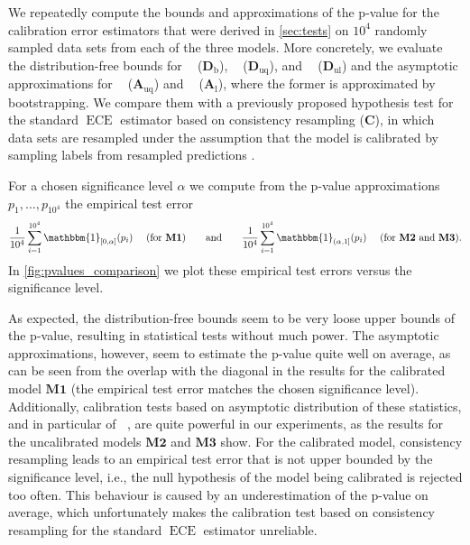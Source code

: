 \documentclass{article}
\DeclareMathOperator{\ECE}{ECE}
\DeclareMathOperator{\biasedestimator}{\widehat{SKCE}_b}
\DeclareMathOperator{\unbiasedestimator}{\widehat{SKCE}_{uq}}
\DeclareMathOperator{\linearestimator}{\widehat{SKCE}_{ul}}
\begin{document}
We repeatedly compute the bounds and approximations of the p-value for the
calibration error estimators that were derived in \cref{sec:tests} on $10^4$
randomly sampled data sets from each of the three models. More concretely, we
evaluate the distribution-free bounds for $\biasedestimator$
($\mathbf{D}_{\mathrm{b}}$), $\unbiasedestimator$ ($\mathbf{D}_{\mathrm{uq}}$), and
$\linearestimator$ ($\mathbf{D}_{\mathrm{ul}}$) and the asymptotic
approximations for $\unbiasedestimator$ ($\mathbf{A}_{\mathrm{uq}}$) and
$\linearestimator$ ($\mathbf{A}_{\mathrm{l}}$), where the former is approximated
by bootstrapping. We compare them with a previously proposed hypothesis test for
the standard $\ECE$ estimator based on consistency resampling ($\mathbf{C}$), in
which data sets are resampled under the assumption that the model is calibrated
by sampling labels from resampled predictions
\citep{broecker07_increas_reliab_reliab_diagr,vaicenavicius19_evaluat}.

For a chosen significance level $\alpha$ we compute from the p-value
approximations $p_1,\ldots,p_{10^4}$ the empirical test error
\begin{equation*}
  \frac{1}{10^4} \sum_{i=1}^{10^4} \mathbbm{1}_{[0, \alpha]}(p_i) \quad \text{ (for } \mathbf{M1} \text{)}
  \qquad \text{and} \qquad
  \frac{1}{10^4} \sum_{i=1}^{10^4} \mathbbm{1}_{(\alpha, 1]}(p_i) \quad \text{ (for } \mathbf{M2} \text{ and } \mathbf{M3} \text{)}.
\end{equation*}
In \cref{fig:pvalues_comparison} we plot these empirical test errors versus the
significance level.

As expected, the distribution-free bounds seem to be very loose upper bounds of
the p-value, resulting in statistical tests without much power. The asymptotic
approximations, however, seem to estimate the p-value quite well on average, as
can be seen from the overlap with the diagonal in the results for the calibrated
model $\mathbf{M1}$ (the empirical test error matches the chosen significance
level). Additionally, calibration tests based on asymptotic distribution of
these statistics, and in particular of $\unbiasedestimator$, are quite powerful
in our experiments, as the results for the uncalibrated models $\mathbf{M2}$ and
$\mathbf{M3}$ show. For the calibrated model, consistency resampling leads to an
empirical test error that is not upper bounded by the significance level, i.e.,
the null hypothesis of the model being calibrated is rejected too often. This
behaviour is caused by an underestimation of the p-value on average, which
unfortunately makes the calibration test based on consistency resampling for the
standard $\ECE$ estimator unreliable.
\end{document}
